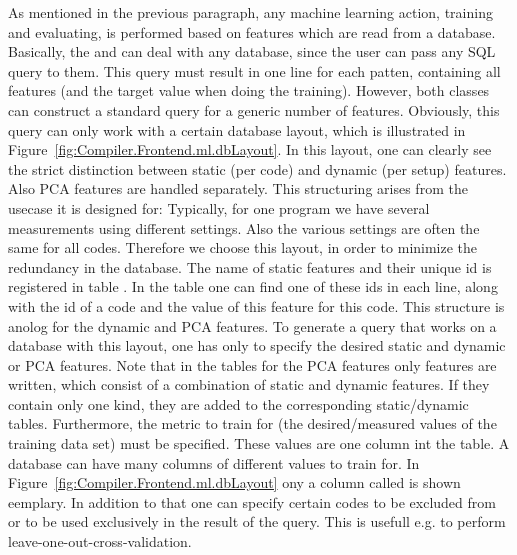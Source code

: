 As mentioned in the previous paragraph, any machine learning action, training and evaluating, is performed based on features which are read from a database. Basically, the  and  can deal with any database, since the user can pass any SQL query to them. This query must result in one line for each patten, containing all features (and the target value when doing the training). However, both classes can construct a standard query for a generic number of features. Obviously, this query can only work with a certain database layout, which is illustrated in Figure~\ref{fig:Compiler.Frontend.ml.dbLayout}. In this layout, one can clearly see the strict distinction between static (per code) and dynamic (per setup) features. Also PCA features are handled separately. This structuring arises from the usecase it is designed for: Typically, for one program we have several measurements using different settings. Also the various settings are often the same for all codes. Therefore we choose this layout, in order to minimize the redundancy in the database. The name of static features and their unique id is registered in table . In the table  one can find one of these ids in each line, along with the id of a code and the value of this feature for this code. This structure is anolog for the dynamic and PCA features. To generate a query that works on a database with this layout, one has only to specify the desired static and dynamic or PCA features. Note that in the tables for the PCA features only features are written, which consist of a combination of static and dynamic features. If they contain only one kind, they are added to the corresponding static/dynamic tables. Furthermore, the metric to train for (the desired/measured values of the training data set) must be specified. These values are one column int the  table. A database can have many columns of different values to train for. In Figure~\ref{fig:Compiler.Frontend.ml.dbLayout} ony a column called  is shown eemplary. In addition to that one can specify certain codes to be excluded from or to be used exclusively in the result of the query. This is usefull e.g. to perform leave-one-out-cross-validation.

